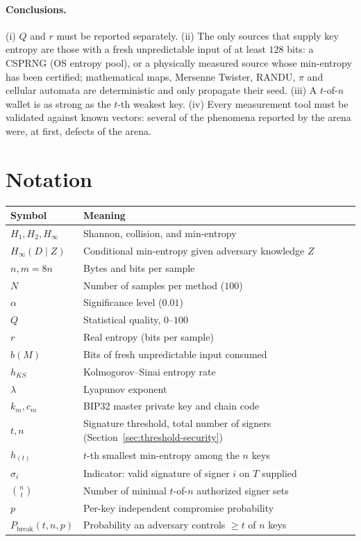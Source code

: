 \documentclass[11pt,a4paper]{article}
\theoremstyle{plain}
\theoremstyle{definition}
\newcommand{\Hmin}{H_\infty}
\begin{document}
\paragraph{Conclusions.} (i) $Q$ and $r$ must be reported separately.
(ii) The only sources that supply key entropy are those with a fresh
unpredictable input of at least $128$ bits: a CSPRNG (OS entropy pool),
or a physically measured source whose min-entropy has been certified;
mathematical maps, Mersenne Twister, RANDU, $\pi$ and cellular automata are
deterministic and only propagate their seed. (iii) A $t$-of-$n$ wallet is as
strong as the $t$-th weakest key. (iv) Every measurement tool must be
validated against known vectors: several of the phenomena reported by the
arena were, at first, defects of the arena.

\appendix
\section{Notation}

\begin{table}[H]
\centering\small
\begin{tabular}{@{}ll@{}}
\toprule
Symbol & Meaning \\
\midrule
$H_1,H_2,\Hmin$ & Shannon, collision, and min-entropy \\
$\Hmin(D\mid Z)$ & Conditional min-entropy given adversary knowledge $Z$ \\
$n,m=8n$ & Bytes and bits per sample \\
$N$ & Number of samples per method ($100$) \\
$\alpha$ & Significance level ($0.01$) \\
$Q$ & Statistical quality, $0$--$100$ \\
$r$ & Real entropy (bits per sample) \\
$b(M)$ & Bits of fresh unpredictable input consumed \\
$h_{KS}$ & Kolmogorov--Sinai entropy rate \\
$\lambda$ & Lyapunov exponent \\
$k_m,c_m$ & BIP32 master private key and chain code \\
$t,n$ & Signature threshold, total number of signers (Section~\ref{sec:threshold-security}) \\
$h_{(t)}$ & $t$-th smallest min-entropy among the $n$ keys \\
$\sigma_i$ & Indicator: valid signature of signer $i$ on $T$ supplied \\
$\binom{n}{t}$ & Number of minimal $t$-of-$n$ authorized signer sets \\
$p$ & Per-key independent compromise probability \\
$P_{\mathrm{break}}(t,n,p)$ & Probability an adversary controls $\ge t$ of $n$ keys \\
\bottomrule
\end{tabular}
\end{table}
\end{document}
